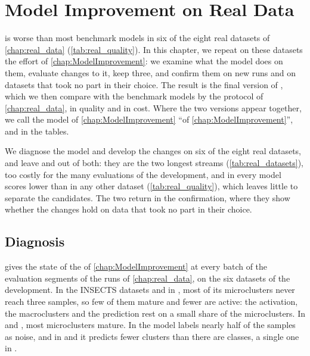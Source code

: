 \chapter{Model Improvement on Real Data}
\label{chap:real_improvement}

\MicroTEDAClusPlus is worse than most benchmark models in six of the eight real datasets of \cref{chap:real_data} (\cref{tab:real_quality}). In this chapter, we repeat on these datasets the effort of \cref{chap:ModelImprovement}: we examine what the model does on them, evaluate changes to it, keep three, and confirm them on new runs and on datasets that took no part in their choice. The result is the final version of \MicroTEDAClusPlus, which we then compare with the benchmark models by the protocol of \cref{chap:real_data}, in quality and in cost. Where the two versions appear together, we call the model of \cref{chap:ModelImprovement} ``\MicroTEDAClusPlus of \cref{chap:ModelImprovement}'', and  in the tables.

We diagnose the model and develop the changes on six of the eight real datasets, and leave \KDDCup and \Covertype out of both: they are the two longest streams (\cref{tab:real_datasets}), too costly for the many evaluations of the development, and in \Covertype every model scores lower than in any other dataset (\cref{tab:real_quality}), which leaves little to separate the candidates. The two return in the confirmation, where they show whether the changes hold on data that took no part in their choice.

\section{Diagnosis}
\label{sec:ri_diagnosis}



 gives the state of the \MicroTEDAClusPlus of \cref{chap:ModelImprovement} at every batch of the evaluation segments of the runs of \cref{chap:real_data}, on the six datasets of the development. In the INSECTS datasets and in \Pendigits, most of its microclusters never reach three samples, so few of them mature and fewer are active: the activation, the macroclusters and the prediction rest on a small share of the microclusters. In \GasDrift and \Shuttle, most microclusters mature. In \InsectsAbrupt the model labels nearly half of the samples as noise, and in \InsectsAbrupt and \InsectsReoccurring it predicts fewer clusters than there are classes, a single one in \InsectsReoccurring.


